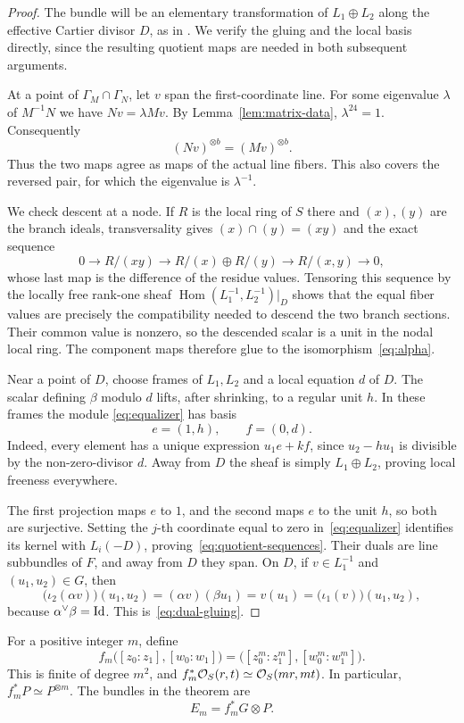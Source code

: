 \begin{proof}
The bundle will be an elementary transformation of $L_1\oplus L_2$
along the effective Cartier divisor $D$, as in
\cite[Introduction, (0.1)]{Maruyama1986}. We verify the gluing and the
local basis directly, since the resulting quotient maps are needed
in both subsequent arguments.

At a point of $\Gamma_M\cap\Gamma_N$, let $v$ span the
first-coordinate line. For some eigenvalue $\lambda$ of $M^{-1}N$
we have $Nv=\lambda Mv$. By Lemma~\ref{lem:matrix-data},
$\lambda^{24}=1$. Consequently
\[
 (Nv)^{\otimes b}=(Mv)^{\otimes b}.
\]
Thus the two maps agree as maps of the actual line fibers. This
also covers the reversed pair, for which the eigenvalue is
$\lambda^{-1}$.

We check descent at a node. If $R$ is the local ring of $S$ there
and $(x),(y)$ are the branch ideals, transversality gives
$(x)\cap(y)=(xy)$ and the exact sequence
\[
 0\longrightarrow R/(xy)\longrightarrow R/(x)\oplus R/(y)
   \longrightarrow R/(x,y)\longrightarrow0,
\]
whose last map is the difference of the residue values. Tensoring
this sequence by the locally free rank-one sheaf
$\operatorname{Hom}(L_1^{-1},L_2^{-1})|_D$ shows that the equal
fiber values are precisely the compatibility needed to descend
the two branch sections. Their common value is nonzero, so the
descended scalar is a unit in the nodal local ring. The component
maps therefore glue to the isomorphism~\eqref{eq:alpha}.

Near a point of $D$, choose frames of $L_1,L_2$ and a local equation
$d$ of $D$. The scalar defining $\beta$ modulo $d$ lifts, after
shrinking, to a regular unit $h$. In these frames the module
\eqref{eq:equalizer} has basis
\begin{equation}\label{eq:local-basis}
 e=(1,h),\qquad f=(0,d).
\end{equation}
Indeed, every element has a unique expression
$u_1e+kf$, since $u_2-hu_1$ is divisible by the non-zero-divisor
$d$. Away from $D$ the sheaf is simply $L_1\oplus L_2$, proving
local freeness everywhere.

The first projection maps $e$ to $1$, and the second maps $e$ to the
unit $h$, so both are surjective. Setting the $j$-th coordinate
equal to zero in~\eqref{eq:equalizer} identifies its kernel with
$L_i(-D)$, proving~\eqref{eq:quotient-sequences}. Their duals are
line subbundles of $F$, and away from $D$ they span. On $D$, if
$v\in L_1^{-1}$ and $(u_1,u_2)\in G$, then
\[
 \bigl(\iota_2(\alpha v)\bigr)(u_1,u_2)
 = (\alpha v)(\beta u_1)=v(u_1)
 =\bigl(\iota_1(v)\bigr)(u_1,u_2),
\]
because $\alpha^\vee\beta=\operatorname{Id}$. This is~\eqref{eq:dual-gluing}.
\end{proof}

For a positive integer $m$, define
\begin{equation}\label{eq:power-maps}
 f_m\bigl([z_0:z_1],[w_0:w_1]\bigr)
   =\bigl([z_0^m:z_1^m],[w_0^m:w_1^m]\bigr).
\end{equation}
This is finite of degree $m^2$, and
$f_m^*\mathcal O_S(r,t)\simeq\mathcal O_S(mr,mt)$. In particular,
$f_m^*P\simeq P^{\otimes m}$. The bundles in the theorem are
\begin{equation}\label{eq:family}
 E_m=f_m^*G\otimes P.
\end{equation}
